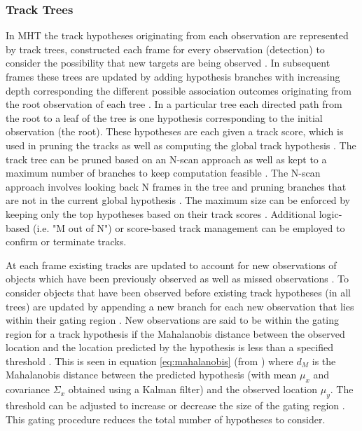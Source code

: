 \documentclass[journal]{IEEEtran}
\begin{document}
\subsubsection{Track Trees}
In MHT the track hypotheses originating from each observation are represented by track trees, constructed each frame for every observation (detection) to consider the possibility that new targets are being observed \cite{kim2015multiple}. In subsequent frames these trees are updated by adding hypothesis branches with increasing depth corresponding the different possible association outcomes originating from the root observation of each tree \cite{kim2015multiple}. In a particular tree each directed path from the root to a leaf of the tree is one hypothesis corresponding to the initial observation (the root). These hypotheses are each given a track score, which is used in pruning the tracks as well as computing the global track hypothesis \cite{kim2015multiple,li2013multitarget,yamada2017multi}. The track tree can be pruned based on an N-scan approach as well as kept to a maximum number of branches to keep computation feasible \cite{kim2015multiple}. The N-scan approach involves looking back N frames in the tree and pruning branches that are not in the current global hypothesis \cite{kim2015multiple}. The maximum size can be enforced by keeping only the top hypotheses based on their track scores \cite{kim2015multiple}. Additional logic-based (i.e. "M out of N") or score-based track management can be employed to confirm or terminate tracks.

At each frame existing tracks are updated to account for new observations of objects which have been previously observed as well as missed observations \cite{kim2015multiple}. To consider objects that have been observed before existing track hypotheses (in all trees) are updated by appending a new branch for each new observation that lies within their gating region \cite{kim2015multiple}. New observations are said to be within the gating region for a track hypothesis if the Mahalanobis distance between the observed location and the location predicted by the hypothesis is less than a specified threshold \cite{kim2015multiple}. This is seen in equation \ref{eq:mahalanobis} (from \cite{kim2015multiple}) where $d_{M}$ is the Mahalanobis distance between the predicted hypothesis (with mean $\mu_x$ and covariance $\Sigma_x$ obtained using a Kalman filter) and the observed location $\mu_y$. The threshold can be adjusted to increase or decrease the size of the gating region \cite{kim2015multiple}. This gating procedure reduces the total number of hypotheses to consider.
\end{document}
